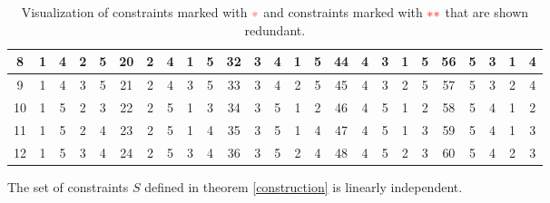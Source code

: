 \begin{table}[h]
{\begin{tabular}{||c | c c c c||c | c c c c||c | c c c c||c | c c c c||c | c c c c||}
			\hline
			8 & 1 & 4 & 2 & 5 & 20 & 2 & 4 & 1 & 5 & 32 & 3 & 4 & 1 & 5 & 44 & 4 & 3 & 1 & 5 & 56 & \cellcolor{red!75}5 & \cellcolor{red!75}3 & \cellcolor{red!75}1 & \cellcolor{red!75}4 \\ 
			\hline
			9 & \cellcolor{red!25}1 & \cellcolor{red!25}4 & \cellcolor{red!25}3 & \cellcolor{red!25}5 & 21 & \cellcolor{red!25}2 & \cellcolor{red!25}4 & \cellcolor{red!25}3 & \cellcolor{red!25}5 & 33 & \cellcolor{red!25}3 & \cellcolor{red!25}4 & \cellcolor{red!25}2 & \cellcolor{red!25}5 & 45 & \cellcolor{red!25}4 & \cellcolor{red!25}3 & \cellcolor{red!25}2 & \cellcolor{red!25}5 & 57 & \cellcolor{red!25}5 & \cellcolor{red!25}3 & \cellcolor{red!25}2 & \cellcolor{red!25}4 \\ 
			\hline
			10 & 1 & 5 & 2 & 3 & 22 & 2 & 5 & 1 & 3 & 34 & 3 & 5 & 1 & 2 & 46 & 4 & 5 & 1 & 2 & 58 & \cellcolor{red!75}5 & \cellcolor{red!75}4 & \cellcolor{red!75}1 & \cellcolor{red!75}2 \\ 
			\hline
			11 & 1 & 5 & 2 & 4 & 23 & 2 & 5 & 1 & 4 & 35 & 3 & 5 & 1 & 4 & 47 & 4 & 5 & 1 & 3 & 59 & \cellcolor{red!75}5 & \cellcolor{red!75}4 & \cellcolor{red!75}1 & \cellcolor{red!75}3 \\ 
			\hline
			12 & \cellcolor{red!25}1 & \cellcolor{red!25}5 & \cellcolor{red!25}3 & \cellcolor{red!25}4 & 24 & \cellcolor{red!25}2 & \cellcolor{red!25}5 & \cellcolor{red!25}3 & \cellcolor{red!25}4 & 36 & \cellcolor{red!25}3 & \cellcolor{red!25}5 & \cellcolor{red!25}2 & \cellcolor{red!25}4 & 48 & \cellcolor{red!25}4 & \cellcolor{red!25}5 & \cellcolor{red!25}2 & \cellcolor{red!25}3 & 60 & \cellcolor{red!25}5 & \cellcolor{red!25}4 & \cellcolor{red!25}2 & \cellcolor{red!25}3 \\ 
			\hline
		\end{tabular}%
	}
	\caption{Visualization of constraints marked with $\textcolor{red!70}{*}$ and constraints marked with $\textcolor{red}{**}$ that are shown redundant.}
\end{table}
\newpage

\begin{theorem} \label{lin}
	The set of constraints $S$ defined in theorem \ref{construction} is linearly independent.
\end{theorem}


